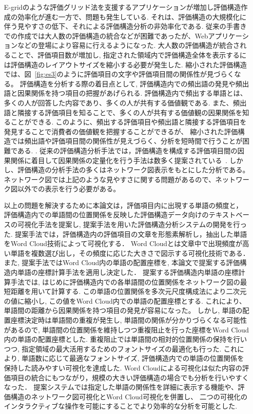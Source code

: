 \documentclass[syuuron]{kuee}
\begin{document}
	E-gridのような評価グリッド法を支援するアプリケーションが増加し評価構造作成の効率化が進む一方で、問題も発生している. 
	それは、評価構造の大規模化に伴う見やすさの低下、それによる評価構造分析の非効率化である. 
	従来の手書きでの作成では大人数の評価構造の統合などが困難であったが、Webアプリケーションなどの登場により容易に行えるようになった. 
	大人数の評価構造が統合されることで、評価項目数が増加し, 指定された領域内で評価構造全体を表示するには評価構造のレイアウトサイズを縮小する必要が発生した.  
	縮小された評価構造では、図~\ref{fig:es3}のように評価項目の文字や評価項目間の関係性が見づらくなる。
	評価構造を分析する際の着目点として, 評価構造内での頻出語の発見や頻出語と因果関係を持つ項目の把握があげられる. 
	評価構造内で頻出する単語とは、多くの人が回答した内容であり、多くの人が共有する価値観である. 
	また、頻出語と隣接する評価項目を知ることで、多くの人が共有する価値観の因果関係を知ることができる. 
	このように、頻出する評価項目や頻出語と隣接する評価項目を発見することで消費者の価値観を把握することができるが、
	縮小された評価構造では頻出語や評価項目間の関係性が見えづらく、分析を短時間で行うことが困難である. 	. 
	従来の評価構造分析手法では，評価構造を構成する評価項目間の因果関係に着目して因果関係の定量化を行う手法は数多く提案されている~\cite{egm8, egm9}. 
	しかし、評価構造の分析手法の多くはネットワーク図表示をもとにした分析である。
	ネットワーク図では上記のような見やすさに関する問題があるので、ネットワーク図以外での表示を行う必要がある。
	
	以上の問題を解決するために本論文は，評価項目内に出現する単語の頻度と，
	評価構造内での単語間の位置関係を反映した評価構造データ向けのテキストベースの可視化手法を提案し, 
	提案手法を用いた評価構造分析システムの開発を行った. 
	提案手法では，評価構造内の評価項目の文章を形態素解析し，抽出した単語をWord Cloud技術によって可視化する．
	Word Cloudとは文章中で出現頻度が高い単語を複数選び出し，その頻度に応じた大きさで図示する可視化技術である．
	また, 提案手法ではWord Cloud内の単語の配置座標を, 本論文で提案する評価構造内単語の座標計算手法を適用し決定した．
	提案する評価構造内単語の座標計算手法では, はじめに評価構造内での各単語間の位置関係をネットワーク図の最短距離を用いて計算する. 
	この単語の位置関係を多次元尺度構成法により二次元の値に縮小し, この値をWord Cloud内での単語の配置座標とする. 
	これにより、単語間の距離から因果関係を持つ項目の発見が容易になった。
	しかし, 単語の配置座標決定時は単語間の重複が発生し, 単語間の関係が分かりづらくなる可能性があるので, 
	単語間の位置関係を維持しつつ重複阻止を行った座標をWord Cloud内の単語の配置座標とした. 
	重複阻止では単語間の相対的位置関係の保持を行いつつ, 指定領域の最大活用するためのフォントサイズの最適化も行った. 
	これにより, 単語数に応じて最適なフォントサイズ, 評価構造内での単語の位置関係を保持した読みやすい可視化を達成した. 
	Word Cloudによる可視化は似た内容の評価項目の統合にもつながり，規模の大きい評価構造の場合でも分析を行いやすくなった．
	提案システムでは指定した単語の関係性を詳細に表示する機能や、評価構造のネットワーク図可視化とWord Cloud可視化を併置し、
	二つの可視化のインタラクティブな操作を可能にすることでより効率的な分析を可能とした. 
\end{document}
